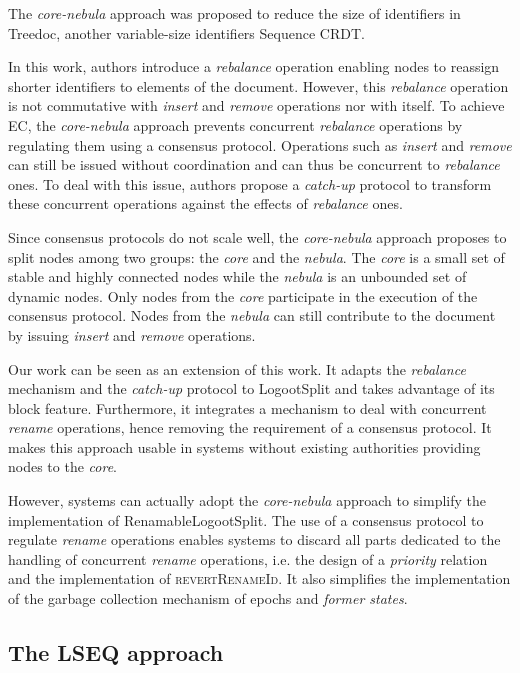 \documentclass[10pt,journal,compsoc]{IEEEtran}
\newcommand{\ie}{i.e. }
\begin{document}
The \emph{core-nebula} approach \cite{letia:hal-01248270, zawirski:hal-01248197} was proposed to reduce the size of identifiers in Treedoc\cite{5158449}, another variable-size identifiers Sequence \ac{CRDT}.

In this work, authors introduce a \emph{rebalance} operation enabling nodes to reassign shorter identifiers to elements of the document.
However, this \emph{rebalance} operation is not commutative with \emph{insert} and \emph{remove} operations nor with itself.
To achieve \ac{EC}\cite{10.1145/224057.224070}, the \emph{core-nebula} approach prevents concurrent \emph{rebalance} operations by regulating them using a consensus protocol.
Operations such as \emph{insert} and \emph{remove} can still be issued without coordination and can thus be concurrent to \emph{rebalance} ones.
To deal with this issue, authors propose a \emph{catch-up} protocol to transform these concurrent operations against the effects of \emph{rebalance} ones.

Since consensus protocols do not scale well, the \emph{core-nebula} approach proposes to split nodes among two groups: the \emph{core} and the \emph{nebula}.
The \emph{core} is a small set of stable and highly connected nodes while the \emph{nebula} is an unbounded set of dynamic nodes.
Only nodes from the \emph{core} participate in the execution of the consensus protocol.
Nodes from the \emph{nebula} can still contribute to the document by issuing \emph{insert} and \emph{remove} operations.

Our work can be seen as an extension of this work.
It adapts the \emph{rebalance} mechanism and the \emph{catch-up} protocol to LogootSplit and takes advantage of its block feature.
Furthermore, it integrates a mechanism to deal with concurrent \emph{rename} operations, hence removing the requirement of a consensus protocol.
It makes this approach usable in systems without existing authorities providing nodes to the \emph{core}.

However, systems can actually adopt the \emph{core-nebula} approach to simplify the implementation of RenamableLogootSplit.
The use of a consensus protocol to regulate \emph{rename} operations enables systems to discard all parts dedicated to the handling of concurrent \emph{rename} operations, \ie the design of a \emph{priority} relation and the implementation of \textsc{revertRenameId}.
It also simplifies the implementation of the garbage collection mechanism of epochs and \emph{former states}.

\subsection{The LSEQ approach}
\end{document}
